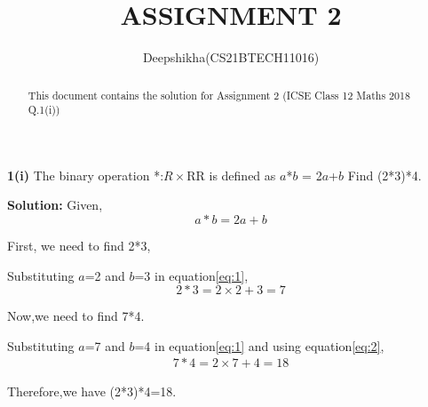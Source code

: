 \documentclass[journal, 12pt, twocolumn]{IEEEtran}
\begin{document}
\title{ASSIGNMENT 2}
\author{Deepshikha(CS21BTECH11016)}
\maketitle

\begin{abstract}
This document contains the solution for Assignment 2 (ICSE Class 12 Maths 2018 Q.1(i))
\end{abstract}

\textbf{1(i)}
The binary operation *:$R\times$R\textrightarrow R is defined as $a$*$b$ = 2$a$+$b$ Find (2*3)*4.


\textbf{Solution:}
Given,
\begin{equation}
     a*b=2a+b\label{eq:1}
\end{equation}

First, we need to find 2*3,


Substituting $a$=2 and $b$=3 in equation\eqref{eq:1},
\begin{equation}
    2*3=2\times2+3=7\label{eq:2}
\end{equation}

Now,we need to find 7*4.


Substituting $a$=7 and $b$=4 in equation\eqref{eq:1} and using equation\eqref{eq:2},
\begin{align*}
    7*4=2\times7+4=18
\end{align*}

Therefore,we have (2*3)*4=18.
\end{document}
